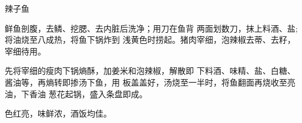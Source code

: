 \begin{recipe}{辣子鱼}

\ingredients



\cooking

\step 鲜鱼剖腹，去鳞、挖腮、去内脏后洗净；用刀在鱼背 两面划数刀，抹上料酒、盐;将油烧至八成热，将鱼下锅炸到 浅黄色时捞起。猪肉宰细，泡辣椒去蒂、去籽，宰细待用。

\step 先将宰细的瘦肉下锅熵酥，加姜米和泡辣椒，解散即 下料酒、味精、盐、白糖、酱油等，再熵转即掺汤下鱼，用 板盖盖好，汤烧至一半时，将鱼翻面再烧收至亮油，下香油 葱花起锅，盛入条盘即成。

\notes

色红亮，味鲜浓，酒饭均佳。

\end{recipe}

